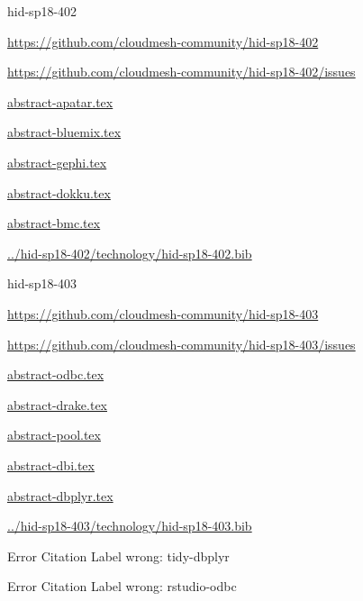\begin{IU}

hid-sp18-402

\url{https://github.com/cloudmesh-community/hid-sp18-402}

\url{https://github.com/cloudmesh-community/hid-sp18-402/issues}

\href{https://github.com/cloudmesh-community/hid-sp18-402/blob/master//technology/abstract-apatar.tex}{abstract-apatar.tex}

\href{https://github.com/cloudmesh-community/hid-sp18-402/blob/master//technology/abstract-bluemix.tex}{abstract-bluemix.tex}

\href{https://github.com/cloudmesh-community/hid-sp18-402/blob/master//technology/abstract-gephi.tex}{abstract-gephi.tex}

\href{https://github.com/cloudmesh-community/hid-sp18-402/blob/master//technology/abstract-dokku.tex}{abstract-dokku.tex}

\href{https://github.com/cloudmesh-community/hid-sp18-402/blob/master//technology/abstract-bmc.tex}{abstract-bmc.tex}

\href{https://github.com/cloudmesh-community/hid-sp18-402/blob/master//technology/hid-sp18-402.bib}{../hid-sp18-402/technology/hid-sp18-402.bib}

\end{IU}


\begin{IU}

hid-sp18-403

\url{https://github.com/cloudmesh-community/hid-sp18-403}

\url{https://github.com/cloudmesh-community/hid-sp18-403/issues}

\href{https://github.com/cloudmesh-community/hid-sp18-403/blob/master//technology/abstract-odbc.tex}{abstract-odbc.tex}

\href{https://github.com/cloudmesh-community/hid-sp18-403/blob/master//technology/abstract-drake.tex}{abstract-drake.tex}

\href{https://github.com/cloudmesh-community/hid-sp18-403/blob/master//technology/abstract-pool.tex}{abstract-pool.tex}

\href{https://github.com/cloudmesh-community/hid-sp18-403/blob/master//technology/abstract-dbi.tex}{abstract-dbi.tex}

\href{https://github.com/cloudmesh-community/hid-sp18-403/blob/master//technology/abstract-dbplyr.tex}{abstract-dbplyr.tex}

\href{https://github.com/cloudmesh-community/hid-sp18-403/blob/master//technology/hid-sp18-403.bib}{../hid-sp18-403/technology/hid-sp18-403.bib}

 Error Citation Label wrong: tidy-dbplyr

 Error Citation Label wrong: rstudio-odbc

\end{IU}


